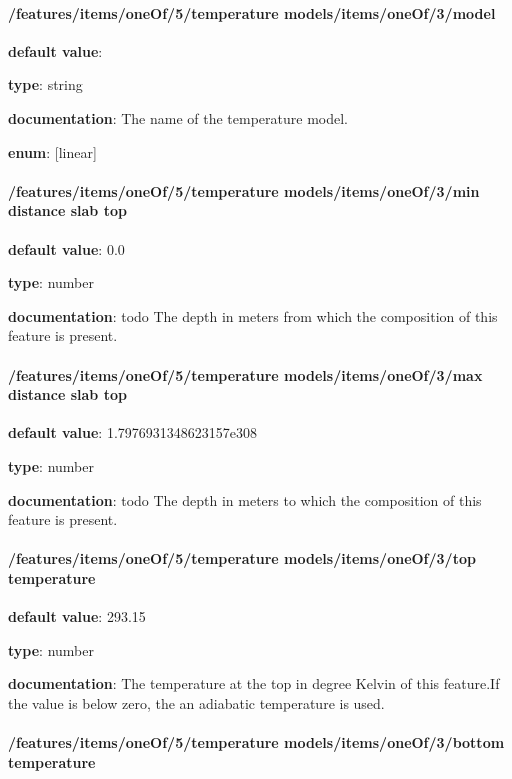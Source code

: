 \paragraph{/features/items/oneOf/5/temperature models/items/oneOf/3/model} \begin{itemized}
\item {\bf default value}: 
\item {\bf type}: string
\item {\bf documentation}: The name of the temperature model.
\item {\bf enum}: [linear]\end{itemized}\paragraph{/features/items/oneOf/5/temperature models/items/oneOf/3/min distance slab top} \begin{itemized}
\item {\bf default value}: 0.0
\item {\bf type}: number
\item {\bf documentation}: todo The depth in meters from which the composition of this feature is present.
\end{itemized}\paragraph{/features/items/oneOf/5/temperature models/items/oneOf/3/max distance slab top} \begin{itemized}
\item {\bf default value}: 1.7976931348623157e308
\item {\bf type}: number
\item {\bf documentation}: todo The depth in meters to which the composition of this feature is present.
\end{itemized}\paragraph{/features/items/oneOf/5/temperature models/items/oneOf/3/top temperature} \begin{itemized}
\item {\bf default value}: 293.15
\item {\bf type}: number
\item {\bf documentation}: The temperature at the top in degree Kelvin of this feature.If the value is below zero, the an adiabatic temperature is used.
\end{itemized}\paragraph{/features/items/oneOf/5/temperature models/items/oneOf/3/bottom temperature} \begin{itemized}

\end{itemized}
